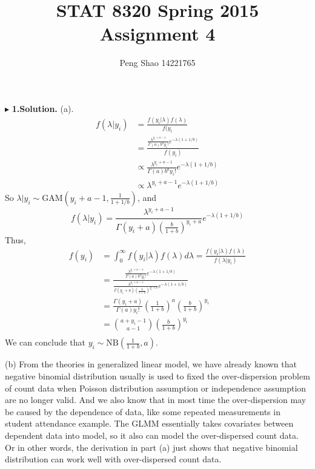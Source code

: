 \documentclass[letterpaper, 12pt]{article}
\newcommand{\ba}{$$\begin{aligned}}
\newcommand{\ea}{\end{aligned}$$}
\begin{document}
\title{STAT 8320 Spring 2015 Assignment 4}
\author{Peng Shao 14221765}
\maketitle
\indent




$\blacktriangleright$ \textbf{1.\quad Solution.} 
(a). 
\ba
f(\lambda|y_i)&=\frac{f(y_i|\lambda)f(\lambda)}{f(y_i}\\
&=\frac{\frac{\lambda^{y_i+a-1}}{\Gamma(a)b^ay_i!}e^{-\lambda(1+1/b)}}{f(y_i)}\\
&\propto \frac{\lambda^{y_i+a-1}}{\Gamma(a)b^ay_i!}e^{-\lambda(1+1/b)}\\
&\propto \lambda^{y_i+a-1}e^{-\lambda(1+1/b)}
\ea
So $\lambda|y_i\sim\text{GAM}(y_i+a-1,\frac{1}{1+1/b})$, and 
$$
f(\lambda|y_i)=\frac{\lambda^{y_i+a-1}}{\Gamma(y_i+a)\left(\frac{b}{1+b}\right)^{y_i+a}}e^{-\lambda(1+1/b)}
$$
Thus, 
\ba
f(y_i)&=\int_0^\infty f(y_i|\lambda)f(\lambda)d\lambda=\frac{f(y_i|\lambda)f(\lambda)}{f(\lambda|y_i)}\\
&=\frac{\frac{\lambda^{y_i+a-1}}{\Gamma(a)b^ay_i!}e^{-\lambda(1+1/b)}}{\frac{\lambda^{y_i+a-1}}{\Gamma(y_i+a)\left(\frac{b}{1+b}\right)^{y_i+a}}e^{-\lambda(1+1/b)}}\\
&=\frac{\Gamma(y_i+a)}{\Gamma(a)y_i!}\left(\frac{1}{1+b}\right)^a\left(\frac{b}{1+b}\right)^{y_i}\\
&=\binom{a+y_i-1}{a-1}\left(\frac{b}{1+b}\right)^{y_i}\\
\ea
We can conclude that $y_i\sim\text{NB}(\frac{1}{1+b},a)$.






(b) From the theories in generalized linear model, we have already known that negative binomial distribution usually is used to fixed the over-dispersion problem of count data when Poisson distribution assumption or independence assumption are no longer valid. And we also know that in most time the over-dispersion may be caused by the dependence of data, like some repeated measurements in student attendance example. The GLMM essentially takes covariates between dependent data into model, so it also can model the over-dispersed count data. Or in other words, the derivation in part (a) just shows that negative binomial distribution can work well with over-dispersed count data.
\end{document}
